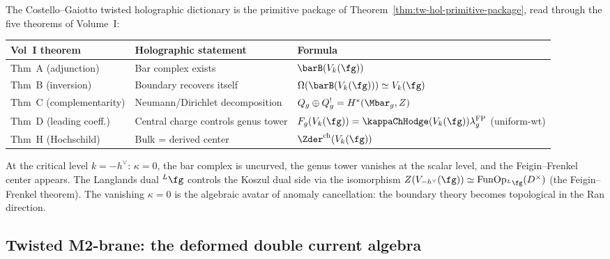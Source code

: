 \begin{remark}
\label{rem:tw-hol-dictionary}
The Costello--Gaiotto twisted holographic dictionary is the primitive
package of Theorem~\ref{thm:tw-hol-primitive-package}, read through the
five theorems of Volume~I:
\begin{center}
\renewcommand{\arraystretch}{1.2}
\small
\begin{tabular}{lll}
\textbf{Vol~I theorem} & \textbf{Holographic statement} & \textbf{Formula} \\
\hline
Thm~A (adjunction) & Bar complex exists & $\barB(V_k(\fg))$ \\
Thm~B (inversion) & Boundary recovers itself &
 $\Omega(\barB(V_k(\fg))) \simeq V_k(\fg)$ \\
Thm~C (complementarity) & Neumann/Dirichlet decomposition &
 $Q_g \oplus Q_g^! = H^*(\Mbar_g, Z)$ \\
Thm~D (leading coeff.) & Central charge controls genus tower &
 $F_g(V_k(\fg))=\kappaChHodge(V_k(\fg))\lambda_g^{\mathrm{FP}}$
 \textup{(}uniform-wt\textup{)} \\
Thm~H (Hochschild) & Bulk = derived center &
 $\Zder^{\mathrm{ch}}(V_k(\fg))$
\end{tabular}
\end{center}
At the critical level $k = -h^\vee$: $\kappa = 0$, the bar complex
is uncurved, the genus tower vanishes at the scalar level, and the
Feigin--Frenkel center appears. The Langlands dual
${}^L\fg$ controls the Koszul dual side via the isomorphism
$Z(V_{-h^\vee}(\fg)) \simeq \operatorname{Fun}\!\operatorname{Op}_{{}^L\fg}(D^\times)$
(the Feigin--Frenkel theorem). The vanishing $\kappa = 0$ is
the algebraic avatar of anomaly cancellation: the boundary
theory becomes topological in the Ran direction.
\end{remark}

%
%

\subsection{Twisted M2-brane: the deformed double current algebra}
\label{subsec:twisted-M2-primitive}

